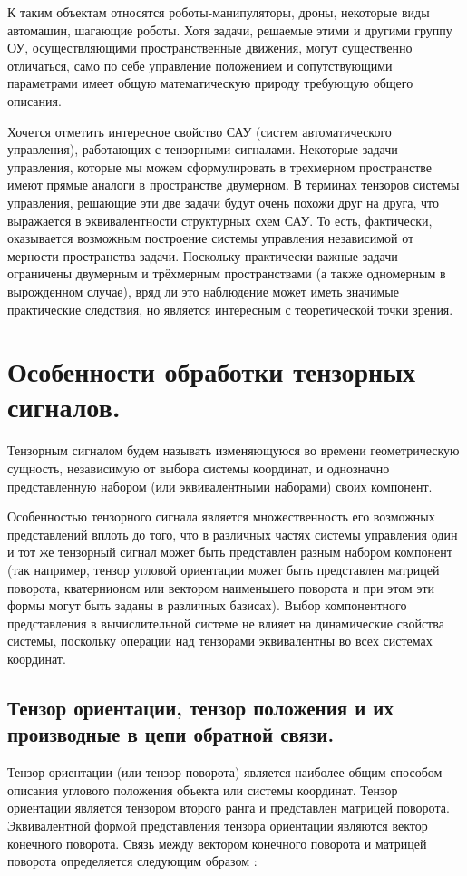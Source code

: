 \documentclass[a4paper]{article}
\begin{document}
К таким объектам относятся роботы-манипуляторы, дроны, некоторые виды автомашин, шагающие роботы. 
Хотя задачи, решаемые этими и другими группу ОУ, осуществляющими пространственные движения, могут существенно отличаться, само по себе управление положением и сопутствующими параметрами имеет общую математическую природу требующую общего описания.

Хочется отметить интересное свойство САУ (систем автоматического управления), работающих с тензорными сигналами. Некоторые задачи управления, которые мы можем сформулировать в трехмерном пространстве имеют прямые аналоги в пространстве двумерном. В терминах тензоров системы управления, решающие эти две задачи будут очень похожи друг на друга, что выражается в эквивалентности структурных схем САУ. То есть, фактически, оказывается возможным построение системы управления независимой от мерности пространства задачи. Поскольку практически важные задачи ограничены двумерным и трёхмерным пространствами (а также одномерным в вырожденном случае), вряд ли это наблюдение может иметь значимые практические следствия, но является интересным с теоретической точки зрения. 

\section{Особенности обработки тензорных сигналов.} \label{osobtens}
Тензорным сигналом будем называть изменяющуюся во времени геометрическую сущность, независимую от выбора системы координат, и однозначно представленную набором (или эквивалентными наборами) своих компонент. 

Особенностью тензорного сигнала является множественность его возможных представлений вплоть до того, что в различных частях системы управления один и тот же тензорный сигнал может быть представлен разным набором компонент (так например, тензор угловой ориентации может быть представлен матрицей поворота, кватернионом или вектором наименьшего поворота и при этом эти формы могут быть заданы в различных базисах). Выбор компонентного представления в вычислительной системе не влияет на динамические свойства системы, поскольку операции над тензорами эквивалентны во всех системах координат.

\subsection{Тензор ориентации, тензор положения и их производные в цепи обратной связи. }
Тензор ориентации (или тензор поворота) является наиболее общим способом описания углового положения объекта или системы координат. Тензор ориентации является тензором второго ранга и представлен матрицей поворота. Эквивалентной формой представления тензора ориентации являются вектор конечного поворота. Связь между вектором конечного поворота и матрицей поворота определяется следующим образом \cite{zhilin}:
\end{document}
